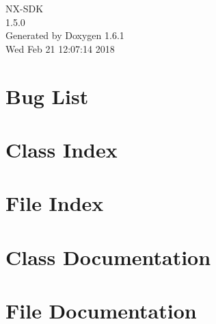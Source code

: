 \documentclass[a4paper]{book}
\begin{document}
\hypersetup{pageanchor=false}
\begin{titlepage}
\vspace*{7cm}
\begin{center}
{\Large NX-\/SDK \\[1ex]\large 1.5.0 }\\
\vspace*{1cm}
{\large Generated by Doxygen 1.6.1}\\
\vspace*{0.5cm}
{\small Wed Feb 21 12:07:14 2018}\\
\end{center}
\end{titlepage}
\clearemptydoublepage
{}
\tableofcontents
\clearemptydoublepage
{}
\hypersetup{pageanchor=true}
\chapter{Bug List}
\label{bug}
\hypertarget{bug}{}

\chapter{Class Index}

\chapter{File Index}

\chapter{Class Documentation}














\chapter{File Documentation}





\printindex
\end{document}

